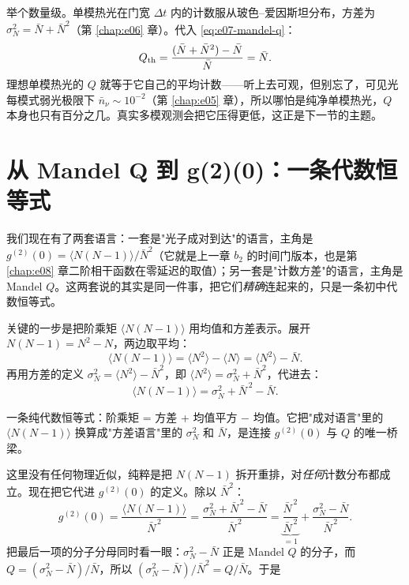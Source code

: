 举个数量级。单模热光在门宽 \(\Delta t\) 内的计数服从玻色--爱因斯坦分布，方差为 \(\sigma_N^2=\bar N+\bar N^2\)（第 \ref{chap:e06} 章）。代入 \eqref{eq:e07-mandel-q}：
\[
  Q_{\rm th}=\frac{(\bar N+\bar N^2)-\bar N}{\bar N}=\bar N .
\]
理想单模热光的 \(Q\) 就等于它自己的平均计数——听上去可观，但别忘了，可见光每模式弱光极限下 \(\bar n_\nu\sim10^{-2}\)（第 \ref{chap:e05} 章），所以哪怕是纯净单模热光，\(Q\) 本身也只有百分之几。真实多模观测会把它压得更低，这正是下一节的主题。

\section{从 Mandel Q 到 g(2)(0)：一条代数恒等式}
\label{sec:e07-q-to-g2}

我们现在有了两套语言：一套是"光子成对到达"的语言，主角是 \(g^{(2)}(0)=\langle N(N-1)\rangle/\bar N^2\)（它就是上一章 \(b_2\) 的时间门版本，也是第 \ref{chap:e08} 章二阶相干函数在零延迟的取值）；另一套是"计数方差"的语言，主角是 Mandel \(Q\)。这两套说的其实是同一件事，把它们\emph{精确}连起来的，只是一条初中代数恒等式。

关键的一步是把阶乘矩 \(\langle N(N-1)\rangle\) 用均值和方差表示。展开 \(N(N-1)=N^2-N\)，两边取平均：
\[
  \big\langle N(N-1)\big\rangle=\big\langle N^2\big\rangle-\langle N\rangle
  =\big\langle N^2\big\rangle-\bar N .
\]
再用方差的定义 \(\sigma_N^2=\langle N^2\rangle-\bar N^2\)，即 \(\langle N^2\rangle=\sigma_N^2+\bar N^2\)，代进去：
\begin{equation}
  \big\langle N(N-1)\big\rangle=\sigma_N^2+\bar N^{\,2}-\bar N .
  \label{eq:e07-identity}
\end{equation}
\begin{formulaexplain}
一条纯代数恒等式：阶乘矩 = 方差 + 均值平方 \(-\) 均值。它把"成对语言"里的 \(\langle N(N-1)\rangle\) 换算成"方差语言"里的 \(\sigma_N^2\) 和 \(\bar N\)，是连接 \(g^{(2)}(0)\) 与 \(Q\) 的唯一桥梁。
\end{formulaexplain}

这里没有任何物理近似，纯粹是把 \(N(N-1)\) 拆开重排，对\emph{任何}计数分布都成立。现在把它代进 \(g^{(2)}(0)\) 的定义。除以 \(\bar N^2\)：
\[
  g^{(2)}(0)=\frac{\langle N(N-1)\rangle}{\bar N^{\,2}}
  =\frac{\sigma_N^2+\bar N^{\,2}-\bar N}{\bar N^{\,2}}
  =\underbrace{\frac{\bar N^{\,2}}{\bar N^{\,2}}}_{=1}
  +\frac{\sigma_N^2-\bar N}{\bar N^{\,2}} .
\]
把最后一项的分子分母同时看一眼：\(\sigma_N^2-\bar N\) 正是 Mandel \(Q\) 的分子，而 \(Q=(\sigma_N^2-\bar N)/\bar N\)，所以 \((\sigma_N^2-\bar N)/\bar N^2=Q/\bar N\)。于是

